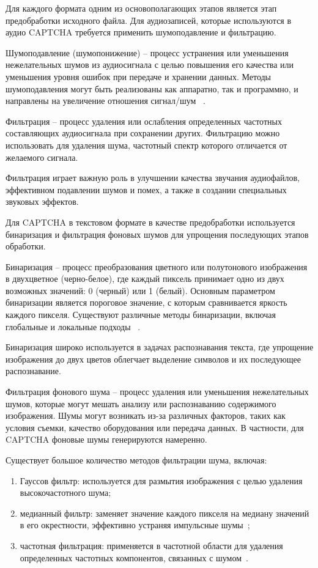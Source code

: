 Для каждого формата одним из основополагающих этапов является этап 
предобработки исходного файла. Для аудиозаписей, которые используются в аудио 
CAPTCHA требуется применить шумоподавление и фильтрацию.

Шумоподавление (шумопонижение) -- процесс устранения или уменьшения нежелательных 
шумов из аудиосигнала с целью повышения его качества или уменьшения уровня ошибок 
при передаче и хранении данных. Методы шумоподавления могут быть реализованы как 
аппаратно, так и программно, и направлены на увеличение отношения сигнал/шум
~\cite{noisecancellation}.

Фильтрация -- процесс удаления или ослабления определенных частотных составляющих 
аудиосигнала при сохранении других. Фильтрацию можно использовать для удаления 
шума, частотный спектр которого отличается от желаемого сигнала.

Фильтрация играет важную роль в улучшении качества звучания аудиофайлов, 
эффективном подавлении шумов и помех, а также в создании специальных звуковых 
эффектов.

Для CAPTCHA в текстовом формате в качестве предобработки используется бинаризация 
и фильтрация фоновых шумов для упрощения последующих этапов обработки.

Бинаризация -- процесс преобразования цветного или полутонового изображения в 
двухцветное (черно-белое), где каждый пиксель принимает одно из двух возможных 
значений: 0 (черный) или 1 (белый). Основным параметром бинаризации является 
пороговое значение, с которым сравнивается яркость каждого пикселя. Существуют 
различные методы бинаризации, включая глобальные и локальные подходы
~\cite{binary}.

Бинаризация широко используется в задачах распознавания текста, где упрощение 
изображения до двух цветов облегчает выделение символов и их последующее 
распознавание.

Фильтрация фонового шума -- процесс удаления или уменьшения нежелательных шумов, 
которые могут мешать анализу или распознаванию содержимого изображения. Шумы 
могут возникать из-за различных факторов, таких как условия съемки, качество 
оборудования или передача данных. В частности, для CAPTCHA фоновые шумы 
генерируются намеренно.

Существует большое количество методов фильтрации шума, включая:

\begin{enumerate}
    \item Гауссов фильтр: используется для размытия изображения с целью удаления 
    высокочастотного шума;
    \item медианный фильтр: заменяет значение каждого пикселя на медиану значений 
    в его окрестности, эффективно устраняя импульсные шумы~\cite{filtr};
    \item частотная фильтрация: применяется в частотной области для удаления 
    определенных частотных компонентов, связанных с шумом~\cite{filtr2}.
\end{enumerate}

